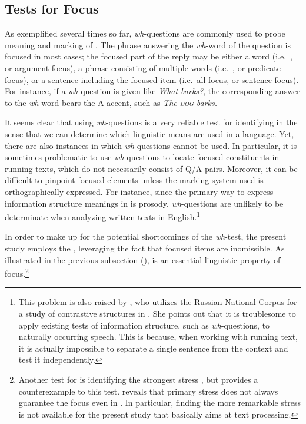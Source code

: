 \subsection{Tests for Focus}
\label{3:ssec:tests-focus}

As exemplified several times so far, \textit{wh}-questions are
commonly used to probe meaning and marking of 
\citep{lambrecht:96,gundel:99}. The phrase
answering the \textit{wh}-word of the question is focused in most
cases; the focused part of the reply may be either a word
(i.e.\ , or argument focus), a phrase consisting of
multiple words (i.e.\ , or predicate focus), or a
sentence including the focused item (i.e.\ all focus, or sentence
focus).  For instance, if a \textit{wh}-question is given like
\textit{What barks?}, the corresponding answer to the \textit{wh}-word
bears the A-accent, such as \textit{The \textsc{dog}
  barks.}


It seems clear that using \textit{wh}-questions is a very reliable
test for identifying  in the sense that we can determine which
linguistic means are used in a language. Yet, there are also instances
in which \textit{wh}-questions cannot be used. In particular, it is
sometimes problematic to use \textit{wh}-questions to locate focused
constituents in running texts, which do not necessarily consist of Q/A
pairs.  Moreover, it can be difficult to pinpoint focused elements
unless the marking system used is orthographically expressed. For
instance, since the primary way to express information structure
meanings in  is
prosody, \textit{wh}-questions
are unlikely to be determinate when analyzing written texts in
English.\footnote{This problem is also raised by \citet{gracheva:13},
  who utilizes the Russian National Corpus for a study of contrastive
  structures in . She points out that it is troublesome
  to apply existing tests of information structure, such as
  \textit{wh}-questions, to naturally occurring speech. This is
  because, when working with running text, it is actually impossible
  to separate a single sentence from the context and test it
  independently.}



In order to make up for the potential shortcomings of the
\textit{wh}-test, the present study employs the ,
leveraging the fact that focused items are inomissible. As illustrated
in the previous subsection (),
 is an essential linguistic property of
focus.\footnote{Another test for  is identifying the strongest
  stress \citep{rebuschi:tuller:99}, but \citet{casielles:04} provides
  a counterexample to this test. \citeauthor{casielles:04} reveals
  that primary stress does not always guarantee the focus even in
  . In particular, finding the more remarkable stress is
  not available for the present study that basically aims at text
  processing.}





